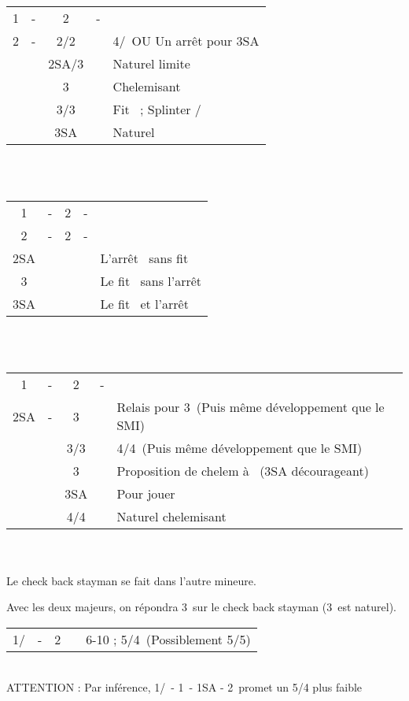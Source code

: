\documentclass[a4paper, oneside, 11pt]{report}
\begin{document}
		\begin{tabular}{cccc|l}
		1\carreau & - & 2\trefle & - &\\
		2\carreau & - & 2\coeur/2\pique && 4\coeur/\pique\ OU Un arrêt pour 3SA\\
		&& 2SA/3\trefle && Naturel limite\\
		&& 3\carreau && Chelemisant \carreau\\
		&& 3\coeur/3\pique && Fit \carreau\ ; Splinter \coeur/\pique\\
		&& 3SA && Naturel\\
		\end{tabular}\\\\

		\begin{tabular}{cccc|l}
		1\carreau & - & 2\trefle & - &\\
		2\carreau & - & 2\coeur & - &\\
		2SA &&&& L'arrêt \pique\ sans fit \coeur\\
		3\coeur &&&& Le fit \coeur\ sans l'arrêt \pique\\
		3SA&&&& Le fit \coeur\ et l'arrêt \pique\\
		\end{tabular}\\\\

		\begin{tabular}{cccc|l}
		1\carreau & - & 2\trefle & - &\\
		2SA & - & 3\trefle && Relais pour 3\carreau\ (Puis même développement que le SMI)\\
		&& 3\carreau/3\coeur && 4\coeur/4\pique\ (Puis même développement que le SMI)\\
		&& 3\pique && Proposition de chelem à \trefle\ (3SA décourageant)\\
		&& 3SA && Pour jouer\\
		&& 4\trefle/4\carreau && Naturel chelemisant\\
		\end{tabular}\\\\

		Le check back stayman se fait dans l'autre mineure.

		Avec les deux majeurs, on répondra 3\coeur\ sur le check back stayman (3\carreau\ est naturel).\\

		\begin{tabular}{cccc|l}
		1\trefle/\carreau & - & 2\coeur && 6-10 ; 5\pique/4\coeur\ (Possiblement 5/5)\\
		\end{tabular}\\
		ATTENTION : Par inférence, 1\trefle/\carreau\ - 1\pique\ - 1SA - 2\coeur\ promet un 5/4 plus faible\\
	
\end{document}
